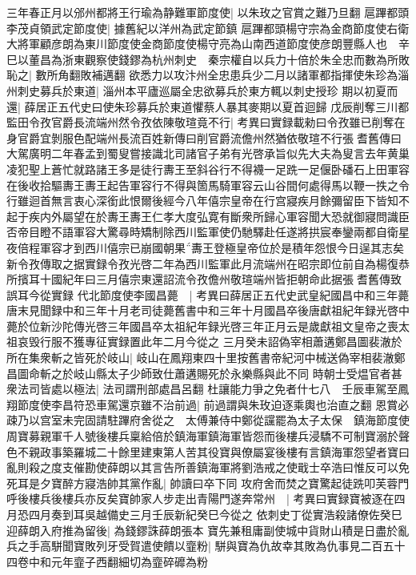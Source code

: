 三年春正月以邠州都將王行瑜為静難軍節度使|{
	以朱玫之官賞之難乃旦翻}
扈蹕都頭李茂貞領武定節度使|{
	據舊紀以洋州為武定節鎮}
扈蹕都頭楊守宗為金商節度使右衛大將軍顧彦朗為東川節度使金商節度使楊守亮為山南西道節度使彦朗豐縣人也　辛巳以董昌為浙東觀察使錢鏐為杭州刺史　秦宗權自以兵力十倍於朱全忠而數為所敗恥之|{
	數所角翻敗補邁翻}
欲悉力以攻汴州全忠患兵少二月以諸軍都指揮使朱珍為淄州刺史募兵於東道|{
	淄州本平廬巡屬全忠欲募兵於東方輒以刺史授珍}
期以初夏而還|{
	薛居正五代史曰使朱珍募兵於東道懼蔡人暴其麥期以夏首迴歸}
戊辰削奪三川都監田令孜官爵長流端州然令孜依陳敬瑄竟不行|{
	考異曰實録載勑曰令孜雖已削奪在身官爵宜剝服色配端州長流百姓新傳曰削官爵流儋州然猶依敬瑄不行張耆舊傳曰大駕廣明二年春孟到蜀叟嘗接識北司諸官子弟有光啓承旨似先大夫為叟言去年黄巢凌犯聖上蒼忙就路諸王多是徒行夀王至斜谷行不得襪一足跣一足偃卧磻石上田軍容在後收拾驅夀王夀王起告軍容行不得與箇馬騎軍容云山谷間何處得馬以鞭一抶之令行雖迴首無言衷心深銜此恨爾後經今八年僖宗皇帝在行宫寢疾月餘彌留臣下皆知不起于疾内外屬望在於夀王夀王仁孝大度弘寛有斷衆所歸心軍容聞大恐就御寢問識臣否帝目瞪不語軍容大驚尋時矯制除西川監軍使仍馳驛赴任遂將拱宸奉鑾兩都自衛星夜倍程軍容才到西川僖宗已崩國朝果夀王登極皇帝位於是積年怨恨今日逞其志矣新令孜傳取之据實録令孜光啓二年為西川監軍此月流端州在昭宗即位前自為楊復恭所擯耳十國紀年曰三月僖宗東還詔流令孜儋州敬瑄端州皆拒朝命此据張耆舊傳致誤耳今從實録}
代北節度使李國昌薨　|{
	考異曰薛居正五代史武皇紀國昌中和三年薨唐末見聞録中和三年十月老司徒薨舊書中和三年十月國昌卒後唐獻祖紀年録光啓中薨於位新沙陀傳光啓三年國昌卒太祖紀年録光啓三年正月云是歲獻祖文皇帝之喪太祖哀毁行服不獲專征實録置此年二月今從之}
三月癸未詔偽宰相蕭遘鄭昌圖裴澈於所在集衆斬之皆死於岐山|{
	岐山在鳳翔東四十里按舊書帝紀河中械送偽宰相裴澈鄭昌圖命斬之於岐山縣太子少師致仕蕭遘賜死於永樂縣與此不同}
時朝士受煴官者甚衆法司皆處以極法|{
	法司謂刑部處昌呂翻}
杜讓能力爭之免者什七八　壬辰車駕至鳳翔節度使李昌符恐車駕還京雖不治前過|{
	前過謂與朱玫迫逐乘輿也治直之翻}
恩賞必疎乃以宫室未完固請駐蹕府舍從之　太傅兼侍中鄭從讜罷為太子太保　鎮海節度使周寶募親軍千人號後樓兵稟給倍於鎮海軍鎮海軍皆怨而後樓兵浸驕不可制寶溺於聲色不親政事築羅城二十餘里建東第人苦其役寶與僚屬宴後樓有言鎮海軍怨望者寶曰亂則殺之度支催勘使薛朗以其言告所善鎮海軍將劉浩戒之使戢士卒浩曰惟反可以免死耳是夕寶醉方寢浩帥其黨作亂|{
	帥讀曰卒下同}
攻府舍而焚之寶驚起徒跣叩芙蓉門呼後樓兵後樓兵亦反矣寶帥家人步走出青陽門遂奔常州　|{
	考異曰實録寶被逐在四月恐四月奏到耳吳越備史三月壬辰新紀癸巳今從之}
依刺史丁從實浩殺諸僚佐癸巳迎薛朗入府推為留後|{
	為錢鏐誅薛朗張本}
寶先兼租庸副使城中貨財山積是日盡於亂兵之手高駢聞寶敗列牙受賀遣使饋以韲粉|{
	駢與寶為仇故幸其敗為仇事見二百五十四卷中和元年韲子西翻細切為韲碎䃺為粉}
